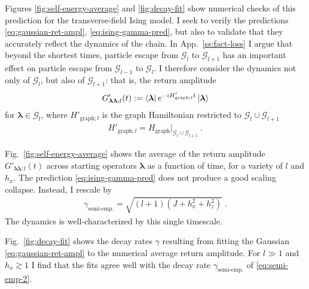 \documentclass[aps,prb,nofootinbib,twocolumn,balancelastpage,amsmath,amssymb,floatfix,superscriptaddress,]{revtex4-1}
\newcommand{\graph}{\mathrm{graph}}
\newcommand{\pool}{\mathcal G}
\newcommand{\semiemp}{\text{semi-emp.}}
\begin{document}
{Figures \ref{fig:self-energy-average} and \ref{fig:decay-fit} show numerical checks of this prediction for the transverse-field Ising model.
I seek to verify the predictions \eqref{eq:gaussian-ret-ampl}, \eqref{eq:ising-gamma-pred},
but also to validate that they accurately reflect the dynamics of the chain.
In App.~\ref{ss:fact-loss} I argue that beyond the shortest times, particle escape from $\pool_l$ to $\pool_{l+1}$
has an important effect on particle escape from $\pool_{l-1}$ to $\pool_l$.
I therefore consider the dynamics not only of $\pool_l$,
but also of $\pool_{l+1}$: that is, the return amplitude
\begin{align}
  \label{eq:single-site-ret-prime}
  G_{\bm\lambda\bm\lambda;l}'(t) := \bra{\bm \lambda} e^{-iH'_{\graph;l}t} \ket{\bm \lambda}
\end{align}
for $\bm \lambda \in \pool_l$, where $H'_{\graph;l}$ is the graph Hamiltonian restricted to $\pool_l \cup \pool_{l+1}$
\begin{align}
  H'_{\graph;l} = H_\graph |_{\pool_l \cup \pool_{l+1}}\;.
\end{align}

Fig.~\ref{fig:self-energy-average} shows
the average of the return amplitude $G'_{\bm \lambda \bm \lambda; l}(t)$
across starting operators $\bm \lambda$
as a function of time, for a variety of $l$ and $h_x$.
The prediction \eqref{eq:ising-gamma-pred} does not produce a good scaling collapse.
Instead, I rescale by
\begin{align}
  \label{eq:semi-emp-2}
  \gamma_{\semiemp} = \sqrt{(l+1)(J + h_x^2 + h_z^2)}\;.
\end{align}
The dynamics is well-characterized by this single timescale.

Fig.~\ref{fig:decay-fit} shows the decay rates $\gamma$ resulting from fitting the Gaussian \eqref{eq:gaussian-ret-ampl} to the numerical average return amplitude.
For $l \gg 1$ and $h_x \gtrsim 1$ I find that the fits agree well with
the decay rate $\gamma_{\semiemp}$ of \eqref{eq:semi-emp-2}.

}
\end{document}
